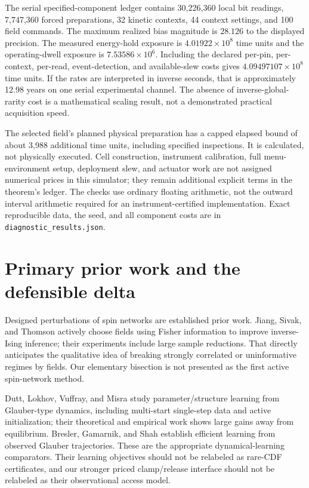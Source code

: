 \documentclass[11pt]{article}
\begin{document}
The serial specified-component ledger contains 30,226,360 local bit readings, 7,747,360 forced preparations, 32 kinetic contexts, 44 context settings, and 100 field commands. The maximum realized bias magnitude is $28.126$ to the displayed precision. The measured energy-hold exposure is $4.01922\times10^8$ time units and the operating-dwell exposure is $7.53586\times10^6$. Including the declared per-pin, per-context, per-read, event-detection, and available-slew costs gives $4.09497107\times10^8$ time units. If the rates are interpreted in inverse seconds, that is approximately 12.98 years on one serial experimental channel. The absence of inverse-global-rarity cost is a mathematical scaling result, not a demonstrated practical acquisition speed.

The selected field's planned physical preparation has a capped elapsed bound of about 3,988 additional time units, including specified inspections. It is calculated, not physically executed. Cell construction, instrument calibration, full menu-environment setup, deployment slew, and actuator work are not assigned numerical prices in this simulator; they remain additional explicit terms in the theorem's ledger. The checks use ordinary floating arithmetic, not the outward interval arithmetic required for an instrument-certified implementation. Exact reproducible data, the seed, and all component costs are in \texttt{diagnostic\_results.json}.

\section{Primary prior work and the defensible delta}
Designed perturbations of spin networks are established prior work. Jiang, Sivak, and Thomson \cite{jiang} actively choose fields using Fisher information to improve inverse-Ising inference; their experiments include large sample reductions. That directly anticipates the qualitative idea of breaking strongly correlated or uninformative regimes by fields. Our elementary bisection is not presented as the first active spin-network method.

Dutt, Lokhov, Vuffray, and Misra \cite{dutt} study parameter/structure learning from Glauber-type dynamics, including multi-start single-step data and active initialization; their theoretical and empirical work shows large gains away from equilibrium. Bresler, Gamarnik, and Shah \cite{bresler} establish efficient learning from observed Glauber trajectories. These are the appropriate dynamical-learning comparators. Their learning objectives should not be relabeled as rare-CDF certificates, and our stronger priced clamp/release interface should not be relabeled as their observational access model.
\end{document}
